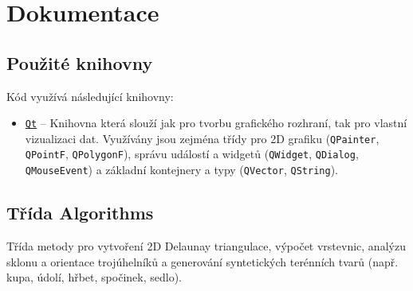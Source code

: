 \section{Dokumentace}

\subsection{Použité knihovny}
Kód využívá následující knihovny:
\begin{itemize}
\item \texttt{\href{https://www.qt.io/}{Qt}} – Knihovna která slouží jak pro tvorbu grafického rozhraní, tak pro vlastní vizualizaci dat. Využívány jsou zejména třídy pro 2D grafiku (\texttt{QPainter}, \texttt{QPointF}, \texttt{QPolygonF}), správu událostí a widgetů (\texttt{QWidget}, \texttt{QDialog}, \texttt{QMouseEvent}) a základní kontejnery a typy (\texttt{QVector}, \texttt{QString}).
\end{itemize}

\subsection{Třída Algorithms}
Třída metody pro vytvoření 2D Delaunay triangulace, výpočet vrstevnic, analýzu sklonu a orientace trojúhelníků a generování syntetických terénních tvarů (např. kupa, údolí, hřbet, spočinek, sedlo).

